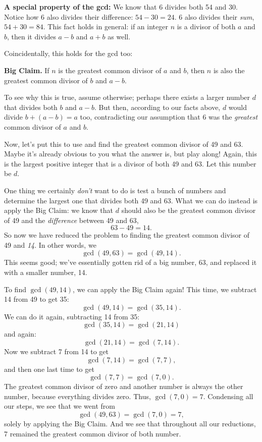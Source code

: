 \documentclass{article}
\begin{document}
\begin{multicols}{3}
\textbf{A special property of the gcd:} We know that 6 divides both 54 and 30. Notice how 6 also divides their difference: $54 - 30 = 24$. 6 also divides their \textit{sum}, $54 + 30 = 84$. This fact holds in general: if an integer $n$ is a divisor of both $a$ and $b$, then it divides $a - b$ and $a + b$ as well.

Coincidentally, this holds for the gcd too:

\textbf{Big Claim.} If $n$ is the greatest common divisor of $a$ and $b$, then $n$ is also the greatest common divisor of $b$ and $a - b$.

To see why this is true, assume otherwise; perhaps there exists a larger number $d$ that divides both $b$ and $a - b$. But then, according to our facts above, $d$ would divide $b + (a - b) = a$ too, contradicting our assumption that 6 was the \textit{greatest} common divisor of $a$ and $b$.

Now, let's put this to use and find the greatest common divisor of 49 and 63. Maybe it's already obvious to you what the answer is, but play along! Again, this is the largest positive integer that is a divisor of both 49 and 63. Let this number be $d$.

One thing we certainly \textit{don't} want to do is test a bunch of numbers and determine the largest one that divides both 49 and 63. What we can do instead is apply the Big Claim: we know that $d$ should also be the greatest common divisor of 49 and the \textit{difference} between 49 and 63,
$$63 - 49 = 14.$$
So now we have reduced the problem to finding the greatest common divisor of 49 and \textit{14}. In other words, we
$$\gcd(49, 63) = \gcd(49, 14).$$
This seems good; we've essentially gotten rid of a big number, 63, and replaced it with a smaller number, 14.

To find $\gcd(49, 14)$, we can apply the Big Claim again! This time, we subtract 14 from 49 to get 35:
$$\gcd(49, 14) = \gcd(35, 14).$$
We can do it again, subtracting 14 from 35:
$$\gcd(35, 14) = \gcd(21, 14)$$
and again:
$$\gcd(21, 14) = \gcd(7, 14).$$
Now we subtract 7 from 14 to get
$$\gcd(7, 14) = \gcd(7, 7),$$
and then one last time to get
$$\gcd(7, 7) = \gcd(7, 0).$$
The greatest common divisor of zero and another number is always the other number, because everything divides zero. Thus, $\gcd(7, 0) = 7$. Condensing all our steps, we see that we went from
$$\gcd(49, 63) = \gcd(7, 0) = 7,$$
solely by applying the Big Claim. And we see that throughout all our reductions, 7 remained the greatest common divisor of both number.


\end{multicols}
\end{document}
